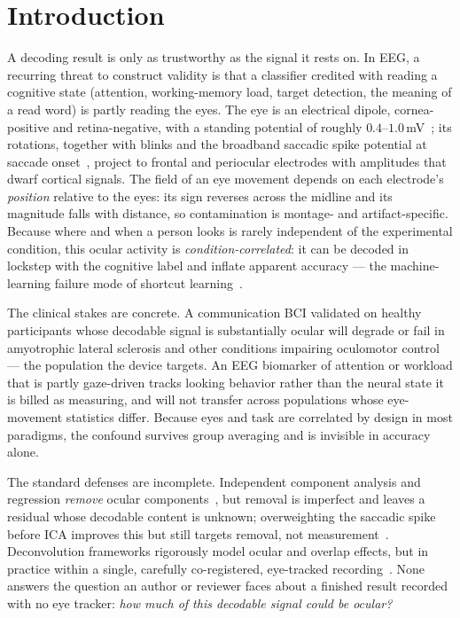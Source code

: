 \documentclass[conference]{IEEEtran}
\begin{document}
\section{Introduction}

A decoding result is only as trustworthy as the signal it rests on. In EEG, a recurring
threat to construct validity is that a classifier credited with reading a cognitive
state (attention, working-memory load, target detection, the meaning of a read
word) is partly reading the eyes. The eye is an electrical dipole, cornea-positive and
retina-negative, with a standing potential of roughly $0.4$--$1.0$\,mV~\cite{malmivuo1995bioelectromagnetism};
its rotations, together with blinks and the broadband saccadic spike potential at saccade
onset~\cite{keren2010saccadic}, project to frontal and periocular electrodes with amplitudes
that dwarf cortical signals. The field of an eye movement depends on each electrode's
\emph{position} relative to the eyes: its sign reverses across the midline and its magnitude
falls with distance, so contamination is montage- and artifact-specific. Because where and when
a person looks is rarely independent of the experimental condition, this ocular activity is
\emph{condition-correlated}: it can be decoded in lockstep with the cognitive label and inflate
apparent accuracy --- the machine-learning failure mode of shortcut
learning~\cite{geirhos2020shortcut}.

The clinical stakes are concrete. A communication BCI validated on healthy participants whose
decodable signal is substantially ocular will degrade or fail in amyotrophic lateral sclerosis
and other conditions impairing oculomotor control --- the population the device targets. An EEG
biomarker of attention or workload that is partly gaze-driven tracks looking behavior rather
than the neural state it is billed as measuring, and will not transfer across populations whose
eye-movement statistics differ. Because eyes and task are correlated by design in most
paradigms, the confound survives group averaging and is invisible in accuracy alone.

The standard defenses are incomplete. Independent component analysis and regression
\emph{remove} ocular components~\cite{jung2000removing}, but removal is imperfect and leaves a
residual whose decodable content is unknown; overweighting the saccadic spike before ICA improves
this but still targets removal, not measurement~\cite{dimigen2020optimizing}. Deconvolution
frameworks rigorously model ocular and overlap effects, but in practice within a single,
carefully co-registered, eye-tracked recording~\cite{ehinger2019unfold}.
None answers the question an author or reviewer faces about a finished result recorded with no
eye tracker: \emph{how much of this decodable signal could be ocular?}
\end{document}
